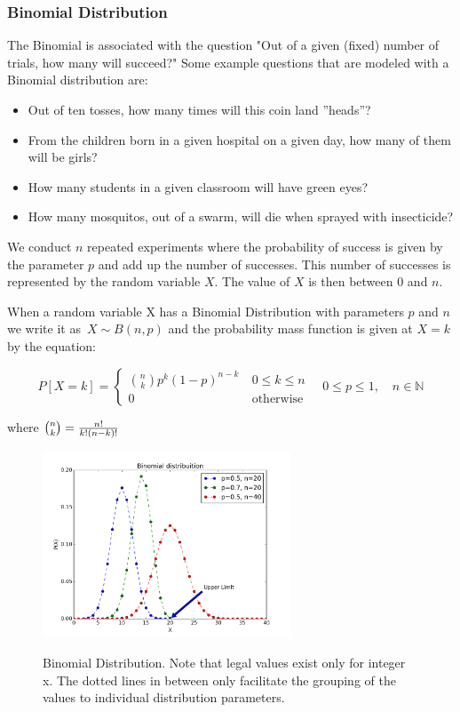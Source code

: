 \subsubsection{Binomial Distribution}\label{sec:binomialDist}
The Binomial is associated with the question "Out of a given (fixed) number of trials, how many will succeed?" Some example questions that are modeled with a Binomial distribution are:
\begin{itemize}
  \item Out of ten tosses, how many times will this coin land ''heads''?
  \item From the children born in a given hospital on a given day, how many of them will be girls?
  \item How many students in a given classroom will have green eyes?
  \item How many mosquitos, out of a swarm, will die when sprayed with insecticide?
\end{itemize}

  We conduct $n$ repeated experiments where the probability of success is given by the parameter $p$ and add up the number of successes. This number of successes is represented by the random variable $X$.  The value of $X$ is then between 0 and $n$.

When a random variable X has a Binomial Distribution with parameters $p$ and $n$ we write it as $\,X \sim B(n,p)$ and the probability mass function is given at $X=k$ by the equation:

\begin{equation}
    P\left[X = k\right] = \begin{cases} {n \choose k} p^k \left(1-p\right)^{n-k}\ & 0 \le k \le n \\ 0 & \mbox{otherwise} \end{cases} \quad 0 \leq p \leq 1, \quad n \in \mathbb{N}
\end{equation}

where ${n \choose k}={n! \over k!(n-k)!}$

\begin{figure}
  \centering
  \includegraphics[width=0.66\textwidth]{../Images/Binomial_distribution_pmf.png}\\
  \caption{Binomial Distribution. Note that legal values exist only for integer x. The dotted lines in between only facilitate the grouping of the values to individual distribution parameters.}
\end{figure}

